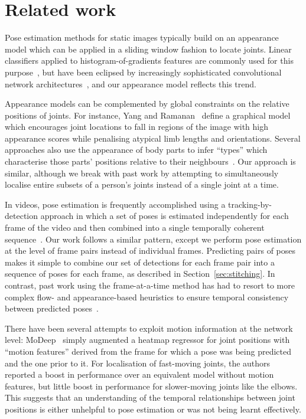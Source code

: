 \documentclass[runningheads]{llncs}
\begin{document}

\section{Related work}

Pose estimation methods for static images typically build on an appearance model
which can be applied in a sliding window fashion to locate joints. Linear
classifiers applied to histogram-of-gradients features are commonly used for
this purpose~\cite{yang2011articulated,cherian2014mixing}, but have been
eclipsed by increasingly sophisticated convolutional network
architectures~\cite{jain2014modeep,tompson2014joint,chen2014articulated,pfister2015flowing,wei2016convolutional},
and our appearance model reflects this trend.

Appearance models can be complemented by global constraints on the relative
positions of joints. For instance, Yang and Ramanan~\cite{yang2011articulated}
define a graphical model which encourages joint locations to fall in regions of
the image with high appearance scores while penalising atypical limb lengths and
orientations. Several approaches also use the appearance of body parts to infer
``types'' which characterise those parts' positions relative to their
neighbours~\cite{yang2011articulated,chen2014articulated}. Our approach is
similar, although we break with past work by attempting to simultaneously
localise entire subsets of a person's joints instead of a single joint at a
time.

In videos, pose estimation is frequently accomplished using a
tracking-by-detection approach in which a set of poses is estimated
independently for each frame of the video and then combined into a single
temporally coherent
sequence~\cite{andriluka2010monocular,ferrari2008progressive,cherian2014mixing,ramanan2005strike}.
Our work follows a similar pattern, except we perform pose estimation at the
level of frame pairs instead of individual frames. Predicting pairs of poses
makes it simple to combine our set of detections for each frame pair into a
sequence of poses for each frame, as described in Section~\ref{sec:stitching}.
In contrast, past work using the frame-at-a-time method has had to resort to
more complex flow- and appearance-based heuristics to ensure temporal
consistency between predicted poses~\cite{cherian2014mixing}.

There have been several attempts to exploit motion information at the network
level: MoDeep~\cite{jain2014modeep} simply augmented a heatmap regressor for
joint positions with ``motion features'' derived from the frame for which a pose
was being predicted and the one prior to it. For localisation of fast-moving
joints, the authors reported a boost in performance over an equivalent model
without motion features, but little boost in performance for slower-moving
joints like the elbows. This suggests that an understanding of the temporal
relationships between joint positions is either unhelpful to pose estimation or
was not being learnt effectively.
\end{document}
